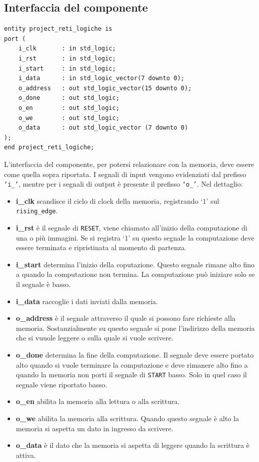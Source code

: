 \documentclass[11pt, a4paper]{article}
\begin{document}
\subsection{Interfaccia del componente}
\begin{lstlisting}
entity project_reti_logiche is
port (
    i_clk       : in std_logic;
    i_rst       : in std_logic;
    i_start     : in std_logic;
    i_data      : in std_logic_vector(7 downto 0);
    o_address   : out std_logic_vector(15 downto 0);
    o_done      : out std_logic;
    o_en        : out std_logic;
    o_we        : out std_logic;
    o_data      : out std_logic_vector (7 downto 0)
);
end project_reti_logiche;
\end{lstlisting}
L'interfaccia del componente, per potersi relazionare con la memoria, deve essere come quella sopra riportata. I segnali di input vengono evidenziati dal prefisso \texttt{\lq i\_'}, mentre per i segnali di output è presente il prefisso \texttt{\lq o\_'}. Nel dettaglio:
\begin{itemize}
  \item \textbf{i\_clk} scandisce il ciclo di clock della memoria, registrando \lq$1$' sul \texttt{rising\_edge}.
  \item \textbf{i\_rst} è il segnale di \texttt{RESET}, viene chiamato all'inizio della computazione di una o più immagini. Se si registra \lq$1$' su questo segnale la computazione deve essere terminata e ripristinata al momento di partenza.
  \item \textbf{i\_start} determina l'inizio della coputazione. Questo segnale rimane alto fino a quando la computazione non termina. La computazione può iniziare solo se il segnale è basso.
  \item \textbf{i\_data} raccoglie i dati inviati dalla memoria.
  \item \textbf{o\_address} è il segnale attraverso il quale si possono fare richieste alla memoria. Sostanzialmente su questo segnale si pone l'indirizzo della memoria che si vuuole leggere o sulla quale si vuole scrivere.
  \item \textbf{o\_done} determina la fine della computazione. Il segnale deve essere portato alto quando si vuole terminare la computazione e deve rimanere alto fino a quando la memoria non porti il segnale di \texttt{START} basso. Solo in quel caso il segnale viene riportato basso.
  \item \textbf{o\_en} abilita la memoria alla lettura o alla scrittura.
  \item \textbf{o\_we}  abilita la memoria alla scrittura. Quando questo segnale è alto la memoria si aspetta un dato in ingresso da scrivere.
  \item \textbf{o\_data} è il dato che la memoria si aspetta di leggere quando la scrittura è attiva.
\end{itemize}
\pagebreak
\end{document}
